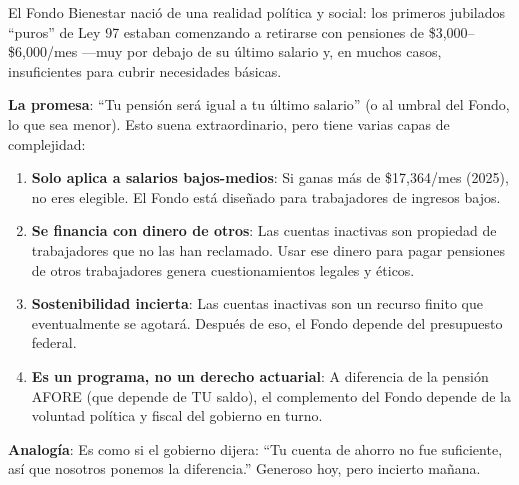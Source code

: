 \documentclass[11pt,a4paper]{report}
\begin{document}
\begin{tcolorbox}[colback=green!5!white, colframe=green!50!black, title=\textbf{Intuici\'on}]
El Fondo Bienestar naci\'o de una realidad pol\'itica y social: los primeros jubilados ``puros'' de Ley 97 estaban comenzando a retirarse con pensiones de \$3,000--\$6,000/mes ---muy por debajo de su \'ultimo salario y, en muchos casos, insuficientes para cubrir necesidades b\'asicas.

\textbf{La promesa}: ``Tu pensi\'on ser\'a igual a tu \'ultimo salario'' (o al umbral del Fondo, lo que sea menor). Esto suena extraordinario, pero tiene varias capas de complejidad:

\begin{enumerate}[nosep]
\item \textbf{Solo aplica a salarios bajos-medios}: Si ganas m\'as de \$17,364/mes (2025), no eres elegible. El Fondo est\'a dise\~nado para trabajadores de ingresos bajos.
\item \textbf{Se financia con dinero de otros}: Las cuentas inactivas son propiedad de trabajadores que no las han reclamado. Usar ese dinero para pagar pensiones de otros trabajadores genera cuestionamientos legales y \'eticos.
\item \textbf{Sostenibilidad incierta}: Las cuentas inactivas son un recurso finito que eventualmente se agotar\'a. Despu\'es de eso, el Fondo depende del presupuesto federal.
\item \textbf{Es un programa, no un derecho actuarial}: A diferencia de la pensi\'on AFORE (que depende de TU saldo), el complemento del Fondo depende de la voluntad pol\'itica y fiscal del gobierno en turno.
\end{enumerate}

\textbf{Analog\'ia}: Es como si el gobierno dijera: ``Tu cuenta de ahorro no fue suficiente, as\'i que nosotros ponemos la diferencia.'' Generoso hoy, pero incierto ma\~nana.
\end{tcolorbox}
\end{document}
